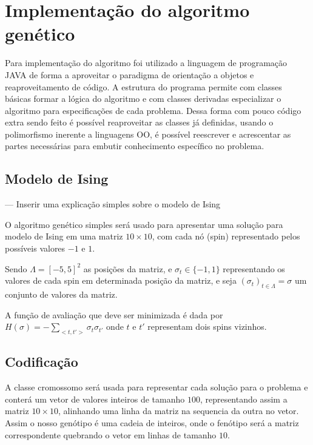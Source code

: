 
\chapter{Implementação do algoritmo genético}
\label{chap:implementGA}

Para implementação do algoritmo foi utilizado a linguagem de programação JAVA de forma a aproveitar o paradigma de orientação a objetos e reaproveitamento de código. A estrutura do programa permite com classes básicas formar a lógica do algoritmo e com classes derivadas especializar o algoritmo para especificações de cada problema. Dessa forma com pouco código extra sendo feito é possível reaproveitar as classes já definidas, usando o polimorfismo inerente a linguagens OO, é possível reescrever e acrescentar as partes necessárias para embutir conhecimento específico no problema.

\section{Modelo de Ising}

--- Inserir uma explicação simples sobre o modelo de Ising

O algoritmo genético simples será usado para apresentar uma solução para modelo de Ising em uma matriz \(10 \times 10\), com cada nó (spin) representado pelos possíveis valores $-1$ e $1$. 

Sendo \(\Lambda = \left[-5,5\right]^2\) as posições da matriz, e \(\sigma_t \in \{-1,1\}\) representando os valores de cada spin em determinada posição da matriz, e seja \( (\sigma_t)_{t \in \Lambda} = \sigma \) um conjunto de valores da matriz. 

A função de avaliação que deve ser minimizada é dada por \( H(\sigma) = -\sum \limits_{<t,t'>}\sigma_t \sigma_{t'} \) onde $t$ e $t'$ representam dois spins vizinhos.   

\section{Codificação}

A classe cromossomo será usada para representar cada solução para o problema e conterá um vetor de valores inteiros de tamanho $100$, representando assim a matriz \( 10 \times 10 \), alinhando uma linha da matriz na sequencia da outra no vetor. Assim o nosso genótipo é uma cadeia de inteiros, onde o fenótipo será a matriz correspondente quebrando o vetor em linhas de tamanho $10$.

